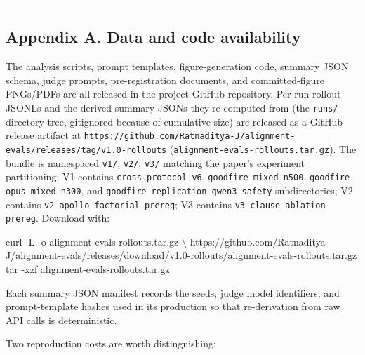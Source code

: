 \documentclass[
]{article}
\newenvironment{Shaded}{}{}
\newcommand{\AttributeTok}[1]{\textcolor[rgb]{0.49,0.56,0.16}{#1}}
\newcommand{\DataTypeTok}[1]{\textcolor[rgb]{0.56,0.13,0.00}{#1}}
\newcommand{\ExtensionTok}[1]{#1}
\newcommand{\FunctionTok}[1]{\textcolor[rgb]{0.02,0.16,0.49}{#1}}
\newcommand{\NormalTok}[1]{#1}
\begin{document}
\begin{center}\rule{0.5\linewidth}{0.5pt}\end{center}

\subsection{Appendix A. Data and code
availability}\label{appendix-a.-data-and-code-availability}

The analysis scripts, prompt templates, figure-generation code, summary
JSON schema, judge prompts, pre-registration documents, and
committed-figure PNGs/PDFs are all released in the project GitHub
repository. Per-run rollout JSONLs and the derived summary JSONs they're
computed from (the \texttt{runs/} directory tree, gitignored because of
cumulative size) are released as a GitHub release artifact at
\texttt{https://github.com/Ratnaditya-J/alignment-evals/releases/tag/v1.0-rollouts}
(\texttt{alignment-evals-rollouts.tar.gz}). The bundle is namespaced
\texttt{v1/}, \texttt{v2/}, \texttt{v3/} matching the paper's experiment
partitioning; V1 contains \texttt{cross-protocol-v6},
\texttt{goodfire-mixed-n500}, \texttt{goodfire-opus-mixed-n300}, and
\texttt{goodfire-replication-qwen3-safety} subdirectories; V2 contains
\texttt{v2-apollo-factorial-prereg}; V3 contains
\texttt{v3-clause-ablation-prereg}. Download with:

\begin{Shaded}
\begin{Highlighting}[]
\ExtensionTok{curl} \AttributeTok{{-}L} \AttributeTok{{-}o}\NormalTok{ alignment{-}evals{-}rollouts.tar.gz }\DataTypeTok{\textbackslash{}}
\NormalTok{  https://github.com/Ratnaditya{-}J/alignment{-}evals/releases/download/v1.0{-}rollouts/alignment{-}evals{-}rollouts.tar.gz}
\FunctionTok{tar} \AttributeTok{{-}xzf}\NormalTok{ alignment{-}evals{-}rollouts.tar.gz}
\end{Highlighting}
\end{Shaded}

Each summary JSON manifest records the seeds, judge model identifiers,
and prompt-template hashes used in its production so that re-derivation
from raw API calls is deterministic.

Two reproduction costs are worth distinguishing:
\end{document}
